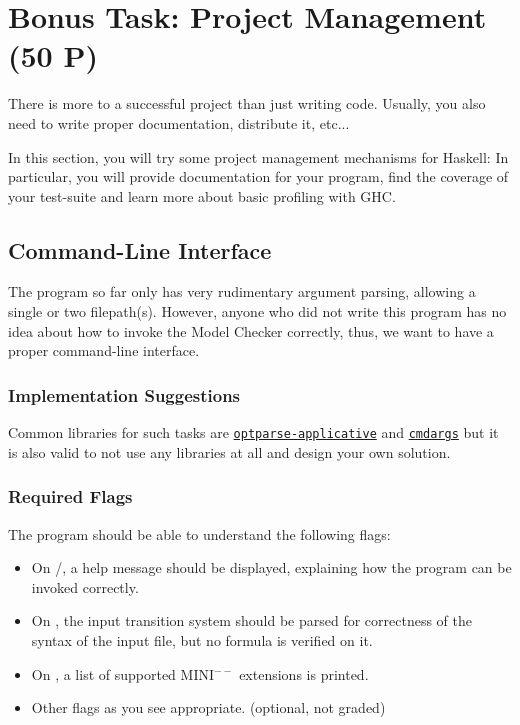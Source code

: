 \documentclass{article}
\begin{document}
\clearpage

\section{Bonus Task: Project Management (50 P)}
\label{sec-bonus}

There is more to a successful project than just writing code. 
Usually, you also need to write proper documentation, distribute it, etc...

In this section, you will try some project management mechanisms for Haskell: 
In particular, you will provide documentation for your program, 
find the coverage of your test-suite and learn more about basic profiling with GHC.

\subsection{Command-Line Interface}

The program so far only has very rudimentary argument parsing, allowing a single or two filepath(s). 
However, anyone who did not write this program has no idea about how to invoke the Model Checker correctly, 
thus, we want to have a proper command-line interface.

\subsubsection*{Implementation Suggestions}

Common libraries for such tasks are \href{https://hackage.haskell.org/package/optparse-applicative}{\texttt{optparse-applicative}} 
and \href{https://hackage.haskell.org/package/cmdargs}{\texttt{cmdargs}} but it is also valid to not use any libraries at all 
and design your own solution.

\subsubsection*{Required Flags}

The program should be able to understand the following flags:

\begin{itemize}
\item On /, a help message should be displayed, explaining how the program can be invoked correctly.
\item On , the input transition system should be parsed for correctness of the syntax of the input file, but no formula is verified on it.
\item On , a list of supported MINI$^{--}$ extensions is printed.
\item Other flags as you see appropriate. (optional, not graded)
\end{itemize}
\end{document}
